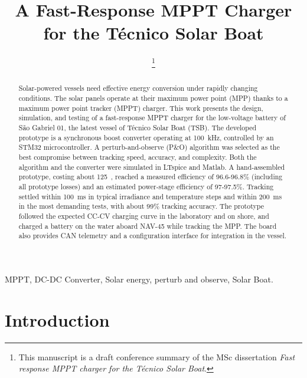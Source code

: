 \documentclass[conference]{IEEEtran}
\begin{document}
\title{A Fast-Response MPPT Charger for the Técnico Solar Boat}

\author{
\thanks{This manuscript is a draft conference summary of the MSc dissertation \emph{Fast response MPPT charger for the Técnico Solar Boat}.}}

\maketitle
\pagestyle{plain}
\thispagestyle{plain}

\begin{abstract}
    Solar-powered vessels need effective energy conversion under rapidly changing conditions. The solar panels operate at their maximum power point (MPP) thanks to a maximum power point tracker (MPPT) charger. This work presents the design, simulation, and testing of a fast-response MPPT charger for the low-voltage battery of São Gabriel 01, the latest vessel of Técnico Solar Boat (TSB). The developed prototype is a synchronous boost converter operating at 100~kHz, controlled by an STM32 microcontroller. A perturb-and-observe (P\&O) algorithm was selected as the best compromise between tracking speed, accuracy, and complexity. Both the algorithm and the converter were simulated in LTspice and Matlab. A hand-assembled prototype, costing about 125~\texteuro{}, reached a measured efficiency of 96.6-96.8\% (including all prototype losses) and an estimated power-stage efficiency of 97-97.5\%. Tracking settled within 100~ms in typical irradiance and temperature steps and within 200~ms in the most demanding tests, with about 99\% tracking accuracy. The prototype followed the expected CC-CV charging curve in the laboratory and on shore, and charged a battery on the water aboard NAV-45 while tracking the MPP. The board also provides CAN telemetry and a configuration interface for integration in the vessel.

\end{abstract}

\begin{IEEEkeywords}
    MPPT, DC-DC Converter, Solar energy, perturb and observe, Solar Boat.
\end{IEEEkeywords}

\section{Introduction}
\end{document}
